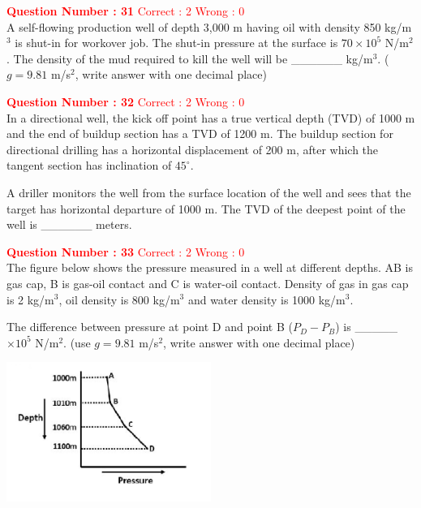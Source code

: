 \documentclass[12pt]{article}
\begin{document}
{\textbf{\textcolor{red}{Question Number : 31}} \hfill \textcolor{red}{Correct : 2  Wrong : 0} \\[1ex]
A self-flowing production well of depth 3,000 m having oil with density 850 kg/m$^3$ is shut-in for workover job. The shut-in pressure at the surface is $70 \times 10^5$ N/m$^2$. The density of the mud required to kill the well will be \_\_\_\_\_\_ kg/m$^3$. ($g = 9.81$ m/s$^2$, write answer with one decimal place)

\vspace{3ex}

\textbf{\textcolor{red}{Question Number : 32}} \hfill \textcolor{red}{Correct : 2  Wrong : 0} \\[1ex]
In a directional well, the kick off point has a true vertical depth (TVD) of 1000 m and the end of buildup section has a TVD of 1200 m. The buildup section for directional drilling has a horizontal displacement of 200 m, after which the tangent section has inclination of $45^\circ$.

A driller monitors the well from the surface location of the well and sees that the target has horizontal departure of 1000 m. The TVD of the deepest point of the well is \_\_\_\_\_\_ meters.

\vspace{3ex}

\textbf{\textcolor{red}{Question Number : 33}} \hfill \textcolor{red}{Correct : 2  Wrong : 0} \\[1ex]
The figure below shows the pressure measured in a well at different depths. AB is gas cap, B is gas-oil contact and C is water-oil contact. Density of gas in gas cap is 2 kg/m$^3$, oil density is 800 kg/m$^3$ and water density is 1000 kg/m$^3$.

The difference between pressure at point D and point B ($P_D - P_B$) is \_\_\_\_\_ $\times 10^5$ N/m$^2$. (use $g = 9.81$ m/s$^2$, write answer with one decimal place)

\begin{center}
    \includegraphics[width=0.5\textwidth]{Figs/GraphQ _33.png} 
\end{center}

}
\end{document}
